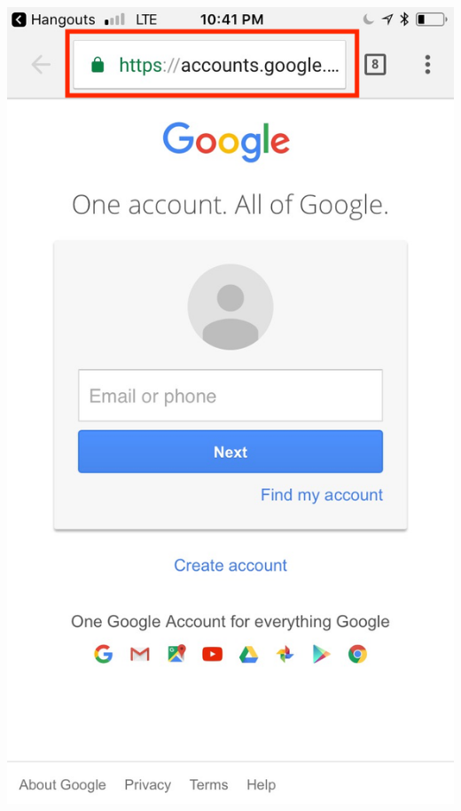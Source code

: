 \documentclass[nobackground,dvipsnames,table,aspectratio=169]{beamer}
\begin{document}
\begin{frame}{}
    \thispagestyle{empty}
    \centering
    \includegraphics[height=0.9\paperheight]{bad-link-mobile}
\end{frame}

\begin{frame}{}
    \thispagestyle{empty}
\end{frame}
\end{document}
